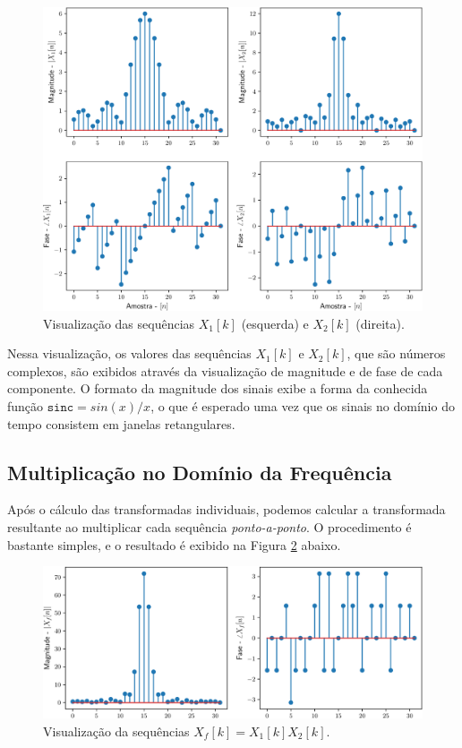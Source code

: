 \documentclass[a4paper,11pt]{article}
\numberwithin{figure}{section}
\numberwithin{equation}{section}
\numberwithin{table}{section}
\theoremstyle{definition}
\begin{document}
\begin{figure}[ht] \centering
	\includegraphics[width=\textwidth]{windowsfft}
	\caption{Visualização das sequências $X_1[k]$ (esquerda) e $X_2[k]$ (direita).}
	\label{fig:windowsfft}
\end{figure}

Nessa visualização, os valores das sequências $X_1[k]$ e $X_2[k]$, que são números complexos, são exibidos através da visualização de magnitude e de fase de cada componente. O formato da magnitude dos sinais exibe a forma da conhecida função $\texttt{sinc} = sin(x)/x$, o que é esperado uma vez que os sinais no domínio do tempo consistem em janelas retangulares.

\subsection{Multiplicação no Domínio da Frequência}

Após o cálculo das transformadas individuais, podemos calcular a transformada resultante ao multiplicar cada sequência \textit{ponto-a-ponto}. O procedimento é bastante simples, e o resultado é exibido na Figura \ref{fig:filterfft} abaixo.

\begin{figure}[ht] \centering
	\includegraphics[width=\textwidth]{filterfft}
	\caption{Visualização da sequências $X_f[k] = X_1[k] X_2[k]$.}
	\label{fig:filterfft}
\end{figure}
\end{document}
